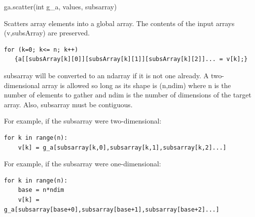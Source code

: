 \documentclass[12pt]{article}
\begin{document}
\begin{pyapi}
\begin{pycode}
ga.scatter(int g_a, values, subsarray)
\end{pycode}
\begin{funcargs}
\end{funcargs}
\end{pyapi}

\ncoll

\begin{desc}

Scatters array elements into a global array. The contents of the input arrays
(v,subsArray) are preserved.

\begin{verbatim}
for (k=0; k<= n; k++)
   {a[[subsArray[k][0]][subsArray[k][1]][subsArray[k][2]]... = v[k];}
\end{verbatim}

\end{desc}

\begin{pydesc}

subsarray will be converted to an ndarray if it is not one already.  A
two-dimensional array is allowed so long as its shape is (n,ndim) where n is
the number of elements to gather and ndim is the number of dimensions of the
target array. Also, subsarray must be contiguous.

For example, if the subsarray were two-dimensional:

\begin{verbatim}
for k in range(n):
    v[k] = g_a[subsarray[k,0],subsarray[k,1],subsarray[k,2]...]
\end{verbatim}

For example, if the subsarray were one-dimensional:

\begin{verbatim}
for k in range(n):
    base = n*ndim
    v[k] = g_a[subsarray[base+0],subsarray[base+1],subsarray[base+2]...]
\end{verbatim}

\end{pydesc}


\end{document}

